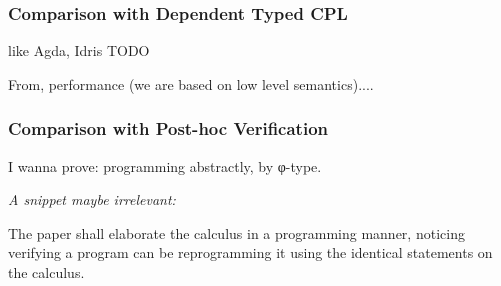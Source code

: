 \subsubsection{Comparison with Dependent Typed CPL}
like Agda, Idris
TODO

From, performance (we are based on low level semantics)....

\subsubsection{Comparison with Post-hoc Verification}

I wanna prove: programming abstractly, by φ-type.

\emph{A snippet maybe irrelevant:}


The paper shall elaborate the calculus in a programming manner, noticing verifying a program can be reprogramming it using the identical statements on the calculus.


